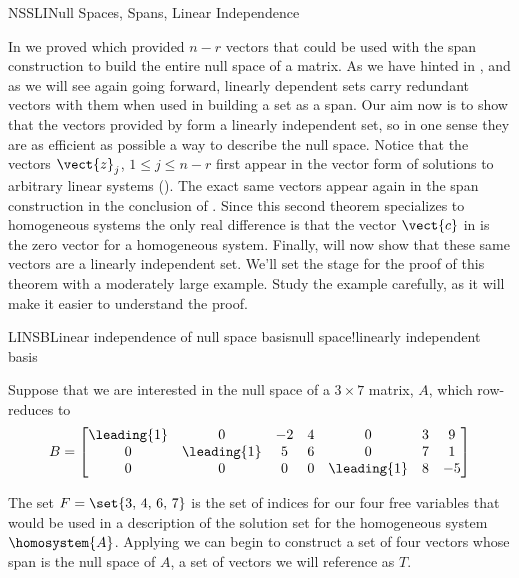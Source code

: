 %
\begin{subsect}{NSSLI}{Null Spaces, Spans, Linear Independence}
%
\begin{para}In  we proved  which provided $n-r$ vectors that could be used with the span construction to build the entire null space of a matrix.  As we have hinted in , and as we will see again going forward, linearly dependent sets carry redundant vectors with them when used in building a set as a span.  Our aim now is to show that the vectors provided by  form a linearly independent set, so in one sense they are as efficient as possible a way to describe the null space.  Notice that the vectors $\vect{z}_j$, $1\leq j\leq n-r$ first appear in the vector form of solutions to arbitrary linear systems ().  The exact same vectors appear again in the span construction in the conclusion of .  Since this second theorem specializes to homogeneous systems the only real difference is that the vector $\vect{c}$ in  is the zero vector for a homogeneous system.  Finally,  will now show that these same vectors are a linearly independent set.  We'll set the stage for the proof of this theorem with a moderately large example.  Study the example carefully, as it will make it easier to understand the proof.\end{para}
%
\begin{example}{LINSB}{Linear independence of null space basis}{null space!linearly independent basis}
\begin{para}Suppose that we are interested in the null space of a $3\times 7$ matrix, $A$, which row-reduces to
%
\begin{equation*}
B=
\begin{bmatrix}
\leading{1} & 0 & -2 & 4 & 0 & 3 & 9\\
0 & \leading{1} & 5 & 6 & 0 & 7 & 1\\
0 & 0 & 0 & 0 & \leading{1} & 8 & -5
\end{bmatrix}
\end{equation*}\end{para}
%
\begin{para}The set $F=\set{3,\,4,\,6,\,7}$ is the set of indices for our four free variables that would be used in a description of the solution set for the homogeneous system $\homosystem{A}$.  Applying  we can begin to construct a set of four vectors whose span is the null space of $A$, a set of vectors we will reference as $T$.

\end{para}
\end{example}
\end{subsect}
